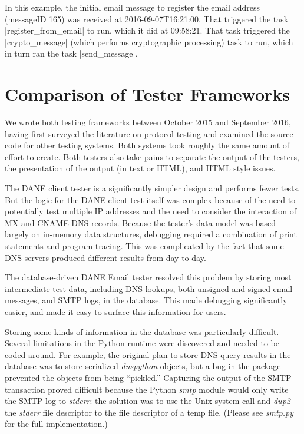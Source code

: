 \documentclass[preprint,3p,11pt]{elsarticle}
\begin{document}
In this example, the initial email message to register the email
address (messageID 165) was received at 2016-09-07T16:21:00. That
triggered the task |register_from_email| to run, which it did at
09:58:21. That task triggered the |crypto_message| (which performs
cryptographic processing) task to run, which in turn ran the task
|send_message|. 


\section{Comparison of Tester Frameworks}

We wrote both testing frameworks between October 2015 and September 2016,
having first surveyed the literature on protocol testing and examined
the source code for other testing systems. Both systems took roughly
the same amount of effort to create. Both testers also take pains to
separate the output of the testers, the presentation of the output (in
text or HTML), and HTML style issues.

The DANE client tester is a significantly simpler design and performs
fewer tests. But the logic for the DANE client test itself was
complex because of the need to potentially test multiple IP addresses
and the need to consider the interaction of MX and CNAME DNS
records. Because the tester's data model was based largely on
in-memory data structures, debugging required a combination of print
statements and program tracing. This was complicated by the fact that
some DNS servers produced different results from day-to-day.

The database-driven DANE Email tester resolved this problem by storing
most intermediate test data, including DNS lookups, both unsigned and
signed email messages, and SMTP logs, in the database. This made
debugging significantly easier, and made it easy to surface this
information for users. 

Storing some kinds of information in the
database was particularly difficult. Several limitations in the Python
runtime were discovered and needed to be coded around. For example,
the original plan to store DNS query results in the database was to
store serialized \emph{dnspython} objects, but a bug in the package prevented
the objects from being ``pickled.'' Capturing the output of the SMTP
transaction proved difficult because the Python \emph{smtp} module
would only write the SMTP log to \emph{stderr}: the solution was to
use the Unix system call and \emph{dup2} the \emph{stderr} file
descriptor to the file descriptor of a temp file. (Please see
\emph{smtp.py} for the full implementation.)
\end{document}
